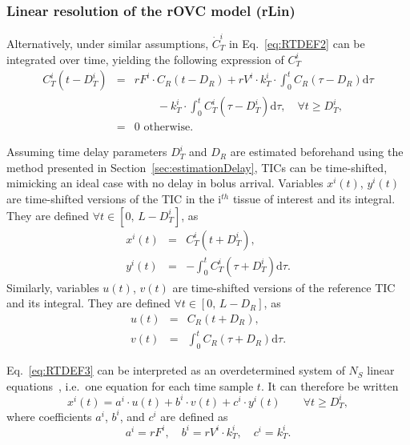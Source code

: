 \subsubsection{Linear resolution of the rOVC model (rLin)}\label{sec:rLin}
Alternatively, under similar assumptions, $\dot{C}_T^i$ in Eq.~\ref{eq:RTDEF2} can be integrated over time, yielding the following expression of $C_T^i$~\cite{CardenasRodriguez:2013em}
\begin{equation}
\begin{array}{rcl}
C_T^i \left(t - D_T^i\right) &=& rF^i \cdot C_{R}\left(t-D_R\right) + rV^i \cdot k_T^i \cdot \int_0^t C_{R} \left(\tau - D_{R}\right) \mathrm d\tau \\
& & \qquad - k_T^i \cdot \int_0^t C_{T}^i \left( \tau - D_{T}^i \right) \mathrm d\tau, \quad \forall t \geq D_T^i,\\
&=& \textrm{0 otherwise.}
\end{array}
\label{eq:RTDEF3}
\end{equation}

Assuming time delay parameters $D_T^i$ and $D_R$ are estimated beforehand using the method presented in Section~\ref{sec:estimationDelay}, TICs can be time-shifted, mimicking an ideal case with no delay in bolus arrival.
Variables $x^i\left(t\right)$, $y^i\left(t\right)$ are time-shifted versions of the TIC in the i$^{th}$ tissue of interest and its integral.
They are defined $\forall t \in \left[ 0,\,L-D_T^i\right]$, as
\begin{equation}
\begin{array}{rcl}
x^i\left(t\right) &=& C_{T}^i\left(t + D_T^i\right), \\
y^i\left(t\right) &=& -\int_0^{t} C_{T}^i \left( \tau + D_T^i \right) \mathrm d\tau.
\end{array}
\label{eq:RTLINV1}
\end{equation}
Similarly, variables $u\left(t\right)$, $v\left(t\right)$ are time-shifted versions of the reference TIC and its integral.
They are defined $\forall t \in \left[ 0,\,L-D_R\right]$, as
\begin{equation}
\begin{array}{rcl}
u\left(t\right) &=& C_{R}\left(t + D_R\right), \\
v\left(t\right) &=& \int_0^t C_{R} \left(\tau + D_R \right) \mathrm d\tau.
\end{array}
\label{eq:RTLINV2}
\end{equation}

Eq.~\ref{eq:RTDEF3} can be interpreted as an overdetermined system of $N_S$ linear equations~\cite{Bjorck:1996uz}, i.e.~one equation for each time sample $t$.
It can therefore be written
\begin{equation}
x^i\left(t\right) = a^i \cdot u\left(t\right) + b^i \cdot v\left(t\right) + c^i \cdot y^i\left(t\right) \qquad \forall t \geq D_T^i,
\label{eq:RTLINF}
\end{equation}
where coefficients $a^i$, $b^i$, and $c^i$ are defined as
\begin{equation}
a^i = rF^i, \quad b^i = rV^i \cdot k_T^i, \quad c^i = k_T^i.
\label{eq:RTLINC}
\end{equation}

